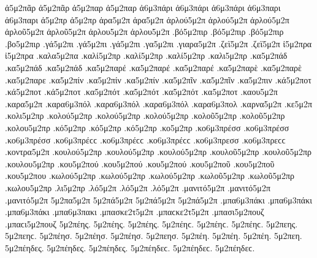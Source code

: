 {ἀ5μ2πᾶρ ἀ5μ2πᾶρ 
ἀ5μ2παρ ἀ5μ2παρ 
ἀ6μ3πάρι ἀ6μ3πάρι ἀ6μ3πάρι   %
ἀ6μ3παρι ἀ6μ3παρι 
ἀ5μ2πρ ἀ5μ2πρ   %
ἀρα5μ2π ἀρα5μ2π   %
ἀρλού5μ2π ἀρλού5μ2π ἀρλού5μ2π   %
ἀρλοῦ5μ2π ἀρλοῦ5μ2π 
ἀρλου5μ2π ἀρλου5μ2π 
.βό5μ2πιρ .βό5μ2πιρ .βό5μ2πιρ   %
.βο5μ2πιρ   %
.γά5μ2πι .γά5μ2πι .γά5μ2πι   %
.γα5μ2πι 
.γιαρα5μ2π   %
.ζεϊ5μ2π .ζεϊ5μ2π   %
ἰ5μ2πρα ἰ5μ2πρα   %
.καλα5μ2πα   %
.καλί5μ2πρ .καλί5μ2πρ .καλί5μ2πρ   %
.καλι5μ2πρ 
.κα5μ2πάδ .κα5μ2πάδ .κα5μ2πάδ   %
.κα5μ2παρέ .κα5μ2παρέ .κα5μ2παρέ   %
.κα5μ2παρὲ .κα5μ2παρὲ 
.κα5μ2παρε 
.κα5μ2πίν .κα5μ2πίν .κα5μ2πίν   %
.κα5μ2πῖν .κα5μ2πῖν 
.κα5μ2πιν 
.κά5μ2ποτ .κά5μ2ποτ .κά5μ2ποτ   %
.κα5μ2πότ .κα5μ2πότ .κα5μ2πότ 
.κα5μ2ποτ 
.καου5μ2π   %
.καρα5μ2π   %
.καρα6μ3πόλ .καρα6μ3πόλ .καρα6μ3πόλ   %
.καρα6μ3πολ 
.καρνα5μ2π   %
.κε5μ2π   %
.κολι5μ2πρ   %
.κολού5μ2πρ .κολού5μ2πρ .κολού5μ2πρ   %
.κολοῦ5μ2πρ .κολοῦ5μ2πρ 
.κολου5μ2πρ 
.κό5μ2πρ .κό5μ2πρ .κό5μ2πρ   %
.κο5μ2πρ 
.κο6μ3πρέσσ .κο6μ3πρέσσ .κο6μ3πρέσσ .κο6μ3πρέϲϲ .κο6μ3πρέϲϲ .κο6μ3πρέϲϲ   %
.κο6μ3πρεσσ .κο6μ3πρεϲϲ 
.κοντρα5μ2π   %
.κουλού5μ2πρ .κουλού5μ2πρ .κουλού5μ2πρ   %
.κουλοῦ5μ2πρ .κουλοῦ5μ2πρ 
.κουλου5μ2πρ 
.κου5μ2πού .κου5μ2πού .κου5μ2πού   %
.κου5μ2ποῦ .κου5μ2ποῦ 
.κου5μ2που 
.κωλού5μ2πρ .κωλού5μ2πρ .κωλού5μ2πρ   %
.κωλοῦ5μ2πρ .κωλοῦ5μ2πρ 
.κωλου5μ2πρ 
.λι5μ2πρ   %
.λό5μ2π .λό5μ2π .λό5μ2π   %
.μανιτό5μ2π .μανιτό5μ2π .μανιτό5μ2π   %
5μ2πα5μ2π   %
5μ2πά5μ2π 5μ2πά5μ2π 5μ2πά5μ2π   %
.μπα6μ3πάκι .μπα6μ3πάκι .μπα6μ3πάκι   %
.μπα6μ3πακι 
.μπασκε2τ5μ2π .μπαϲκε2τ5μ2π   %
.μπασι5μ2πουζ .μπαϲι5μ2πουζ   %
5μ2πέης. 5μ2πέης. 5μ2πέης. 5μ2πέηϲ. 5μ2πέηϲ. 5μ2πέηϲ.   %
5μ2πεης. 5μ2πεηϲ. 
5μ2πέησ. 5μ2πέησ. 5μ2πέησ. 
5μ2πεησ. 
5μ2πέη. 5μ2πέη. 5μ2πέη. 
5μ2πεη. 
5μ2πέηδες. 5μ2πέηδες. 5μ2πέηδες. 5μ2πέηδεϲ. 5μ2πέηδεϲ. 5μ2πέηδεϲ. 
}
